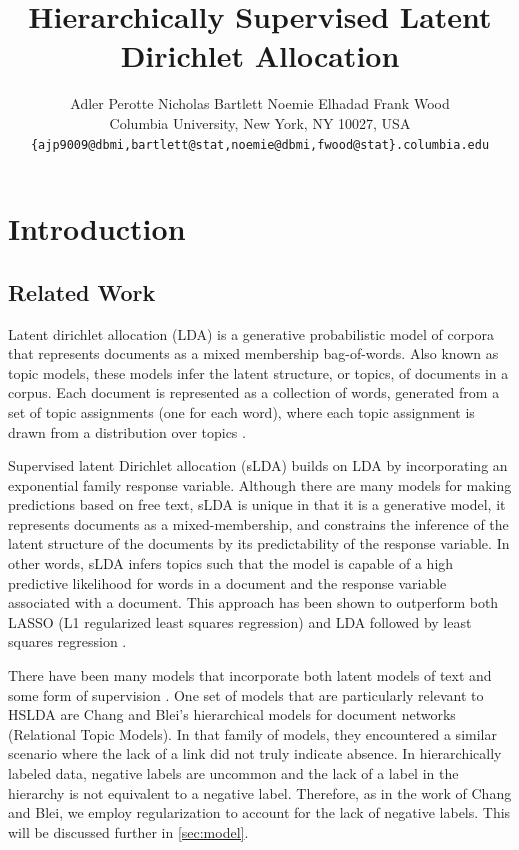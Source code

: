 \documentclass{article}
\title{Hierarchically Supervised Latent Dirichlet Allocation}
\author{
Adler Perotte\hspace{1cm} Nicholas Bartlett \hspace{1cm} Noemie Elhadad \hspace{1cm} Frank Wood\\
Columbia University, New York, NY 10027, USA \\
\texttt{\{ajp9009@dbmi,bartlett@stat,noemie@dbmi,fwood@stat\}.columbia.edu}
}
\begin{document}
\maketitle

\begin{abstract}

\end{abstract}

\section{Introduction}
\label{sec:introduction}





\subsection{Related Work}

\label{sec:related_work} Latent dirichlet allocation (LDA) is a generative
probabilistic model of corpora that represents documents as a mixed
membership bag-of-words. Also known as topic models, these models
infer the latent structure, or topics, of documents in a corpus. Each
document is represented as a collection of words, generated from a
set of topic assignments (one for each word), where each topic assignment
is drawn from a distribution over topics \citep{Blei2003}.

Supervised latent Dirichlet allocation (sLDA) builds on LDA by incorporating
an exponential family response variable. Although there are many models
for making predictions based on free text, sLDA is unique in that
it is a generative model, it represents documents as a mixed-membership,
and constrains the inference of the latent structure of the documents
by its predictability of the response variable. In other words, sLDA
infers topics such that the model is capable of a high predictive
likelihood for words in a document and the response variable associated
with a document. This approach has been shown to outperform both LASSO
(L1 regularized least squares regression) and LDA followed by least
squares regression \citep{BleiMcAuliffe2008}.

There have been many models that incorporate both latent models of
text and some form of supervision \citep{Ramage2009,DiscLDA,wangbleifeifei08,RelationalLDA}.
One set of models that are particularly relevant to HSLDA are Chang
and Blei's hierarchical models for document networks (Relational Topic
Models). In that family of models, they encountered a similar scenario
where the lack of a link did not truly indicate absence. In hierarchically
labeled data, negative labels are uncommon and the lack of a label
in the hierarchy is not equivalent to a negative label. Therefore,
as in the work of Chang and Blei, we employ regularization to account
for the lack of negative labels. This will be discussed further in
\ref{sec:model}.
\end{document}
